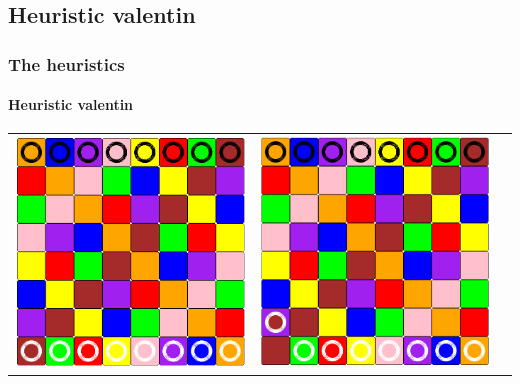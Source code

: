 \documentclass[a4paper, 11pt]{beamer}
\begin{document}
\subsection{Heuristic valentin}
\begin{frame}
\frametitle{The heuristics}
\framesubtitle{Heuristic valentin}
\begin{center}

	\begin{tabular}{c c c}
     \includegraphics[scale = 0.12]{val_1.png} &
     \pause
     \includegraphics[scale = 0.12]{val_2.png} &

\end{tabular}
\end{center}
\end{frame}
\end{document}
